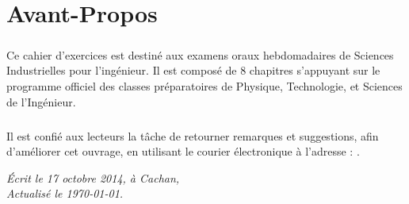 
\chapter*{Avant-Propos}
\paragraph{}
Ce cahier d'exercices est destiné aux examens oraux hebdomadaires de Sciences Industrielles pour l'ingénieur. Il est composé de $8$ chapitres s'appuyant sur le programme officiel des classes préparatoires de Physique, Technologie, et Sciences de l'Ingénieur.

\paragraph{}
Il est confié aux lecteurs la tâche de retourner remarques et suggestions, afin d'améliorer cet ouvrage, en utilisant le courier électronique à l'adresse : \textit{}.

\vfill 
\begin{flushright}
\textit{
	Écrit le 17 octobre 2014, à Cachan,\\
	Actualisé le \today.}
\end{flushright}
\thispagestyle{empty} %
\newpage



{\pagestyle{plain} %
\setcounter{page}{1}

\tableofcontents\label{sommaire} %
\newpage}
